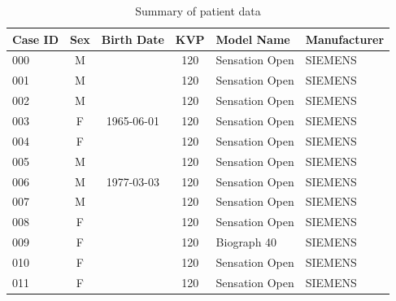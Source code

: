 \documentclass[11pt]{article}
\begin{document}
\begin{table}[h]
    \centering
    \begin{tabular}{|l|c|c|c|l|l|}
    \hline
    \textbf{Case ID} & \textbf{Sex} & \textbf{Birth Date} & \textbf{KVP} & \textbf{Model Name}          & \textbf{Manufacturer} \\ \hline
    000              & M            &                     & 120          & Sensation Open               & SIEMENS               \\ \hline
    001              & M            &                     & 120          & Sensation Open               & SIEMENS               \\ \hline
    002              & M            &                     & 120          & Sensation Open               & SIEMENS               \\ \hline
    003              & F            & 1965-06-01          & 120          & Sensation Open               & SIEMENS               \\ \hline
    004              & F            &                     & 120          & Sensation Open               & SIEMENS               \\ \hline
    005              & M            &                     & 120          & Sensation Open               & SIEMENS               \\ \hline
    006              & M            & 1977-03-03          & 120          & Sensation Open               & SIEMENS               \\ \hline
    007              & M            &                     & 120          & Sensation Open               & SIEMENS               \\ \hline
    008              & F            &                     & 120          & Sensation Open               & SIEMENS               \\ \hline
    009              & F            &                     & 120          & Biograph 40                  & SIEMENS               \\ \hline
    010              & F            &                     & 120          & Sensation Open               & SIEMENS               \\ \hline
    011              & F            &                     & 120          & Sensation Open               & SIEMENS               \\ \hline
    \end{tabular}
    \caption{Summary of patient data}
    \label{tab:patient_meta}
\end{table}
\end{document}
